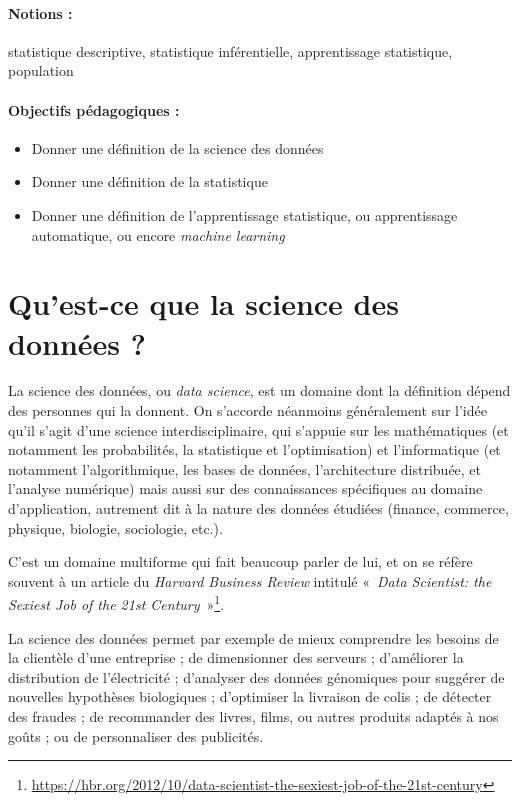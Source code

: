 \label{chap:intro}

\paragraph{Notions :} statistique descriptive, statistique inférentielle,
apprentissage statistique, population

\paragraph{Objectifs pédagogiques :}
\begin{itemize}
\item Donner une définition de la science des données
\item Donner une définition de la statistique 
\item Donner une définition de l'apprentissage statistique, ou apprentissage
  automatique, ou encore \textit{machine learning}
\end{itemize}



\section{Qu'est-ce que la science des données ?}
La science des données, ou \textit{data science}, est un domaine dont la
définition dépend des personnes qui la donnent. On s'accorde néanmoins
généralement sur l'idée qu'il s'agit d'une science interdisciplinaire, qui
s'appuie sur les mathématiques (et notamment les probabilités, la statistique
et l'optimisation) et l'informatique (et notamment l'algorithmique, les bases
de données, l'architecture distribuée, et l'analyse numérique) mais aussi sur
des connaissances spécifiques au domaine d'application, autrement dit à la
nature des données étudiées (finance, commerce, physique, biologie, sociologie,
etc.).

C'est un domaine multiforme qui fait beaucoup parler de lui, et on se réfère
souvent à un article du \textit{Harvard Business Review} intitulé «~\textit{Data Scientist: the Sexiest Job of the 21st Century}~»\footnote{\href{https://hbr.org/2012/10/data-scientist-the-sexiest-job-of-the-21st-century}{https://hbr.org/2012/10/data-scientist-the-sexiest-job-of-the-21st-century}}.

La science des données permet par exemple de mieux comprendre les besoins de la
clientèle d'une entreprise ; de dimensionner des serveurs ; d'améliorer la
distribution de l'électricité ; d'analyser des données génomiques pour suggérer
de nouvelles hypothèses biologiques ; d'optimiser la livraison de colis ; de
détecter des fraudes ; de recommander des livres, films, ou autres produits
adaptés à nos goûts ; ou de personnaliser des publicités.

